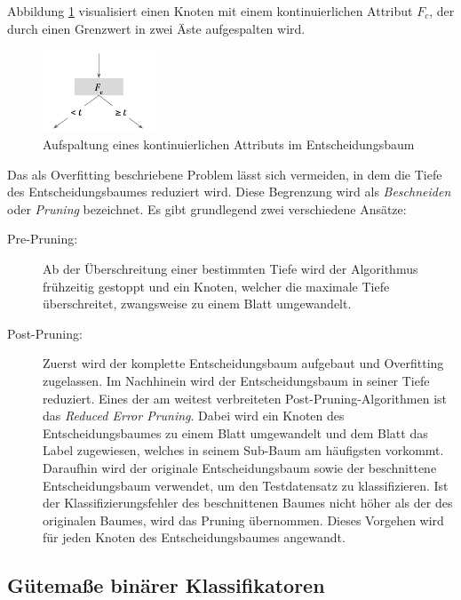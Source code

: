 Abbildung \ref{img:continuos_variable} visualisiert einen Knoten mit einem kontinuierlichen Attribut $F_c$, der durch einen Grenzwert in zwei Äste aufgespalten wird.


\begin{figure}[h]
	\centering
	\includegraphics[width=0.3\textwidth]{bilder/continuos_variable.png}
	\caption{Aufspaltung eines kontinuierlichen Attributs im Entscheidungsbaum}
	\label{img:continuos_variable}
\end{figure}


Das als Overfitting beschriebene Problem lässt sich vermeiden, in dem die Tiefe des Entscheidungsbaumes reduziert wird. Diese Begrenzung wird als \emph{Beschneiden} oder \emph{Pruning} bezeichnet. Es gibt grundlegend zwei verschiedene Ansätze:

\begin{description}
 \item[Pre-Pruning:] Ab der Überschreitung einer bestimmten Tiefe wird der Algorithmus frühzeitig gestoppt und ein Knoten, welcher die maximale Tiefe überschreitet, zwangsweise zu einem Blatt umgewandelt. 
 \item[Post-Pruning:] Zuerst wird der komplette Entscheidungsbaum aufgebaut und Overfitting zugelassen. Im Nachhinein wird der Entscheidungsbaum in seiner Tiefe reduziert. Eines der am weitest verbreiteten Post-Pruning-Algorithmen ist das \emph{Reduced Error Pruning}. Dabei wird ein Knoten des Entscheidungsbaumes zu einem Blatt umgewandelt und dem Blatt das Label zugewiesen, welches in seinem Sub-Baum am häufigsten vorkommt. Daraufhin wird der originale Entscheidungsbaum sowie der beschnittene Entscheidungsbaum verwendet, um den Testdatensatz zu klassifizieren. Ist der Klassifizierungsfehler des beschnittenen Baumes nicht höher als der des originalen Baumes, wird das Pruning übernommen. Dieses Vorgehen wird für jeden Knoten des Entscheidungsbaumes angewandt. \cite[S. 68 - 70]{machine_mitchell} 
\end{description}


\subsection{Gütemaße binärer Klassifikatoren}
\label{sec:howGoodIsMyClassifier}

